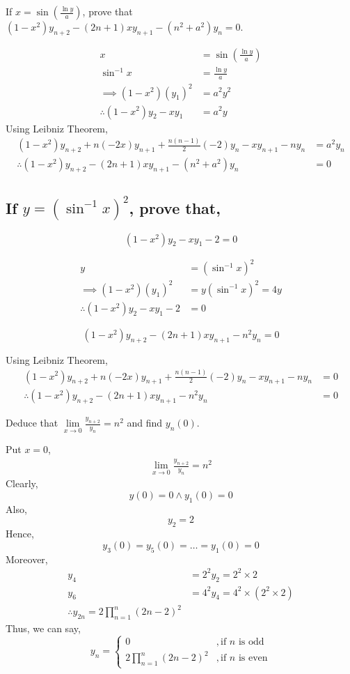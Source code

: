\begin{asign}
	If $x=\sin(\frac{\ln y}{a})$, prove that $(1-x^2)y_{n+2}-(2n+1)xy_{n+1}-(n^2+a^2)y_n=0$.
\end{asign}
\begin{anse}
	\[\begin{split}
		x&=\sin(\frac{\ln y}{a})\\
		\sin^{-1}x&=\frac{\ln y}{a}\\
		\implies (1-x^2)(y_1)^2&=a^2y^2\\
		\therefore (1-x^2)y_2-xy_1&=a^2y
	\end{split}\]
	Using Leibniz Theorem,
	\[\begin{split}
		(1-x^2)y_{n+2}+n(-2x)y_{n+1}+\frac{n(n-1)}{2}(-2)y_n-xy_{n+1}-ny_n&=a^2y_n\\
		\therefore (1-x^2)y_{n+2}-(2n+1)xy_{n+1}-(n^2+a^2)y_n&=0
	\end{split}\]
\end{anse}
\subsection{If $y=(\sin^{-1}x)^2$, prove that,}
\begin{asign}
	\[(1-x^2)y_2-xy_1-2=0\]
\end{asign}
\begin{anse}
	\[\begin{split}
		y&=(\sin^{-1}x)^2\\
		\implies (1-x^2)(y_1)^2&=y(\sin^{-1}x)^2=4y\\
		\therefore (1-x^2)y_2-xy_1-2&=0
	\end{split}\]
\end{anse}
\begin{asign}
	\[(1-x^2)y_{n+2}-(2n+1)xy_{n+1}-n^2y_n=0\]
\end{asign}
\begin{anse}
	Using Leibniz Theorem,
	\[\begin{split}
		(1-x^2)y_{n+2}+n(-2x)y_{n+1}+\frac{n(n-1)}{2}(-2)y_n-xy_{n+1}-ny_n&=0\\
		\therefore (1-x^2)y_{n+2}-(2n+1)xy_{n+1}-n^2y_n&=0
	\end{split}\]
\end{anse}
\begin{asign}
	Deduce that $\lim\limits_{x\to0}\frac{y_{n+2}}{y_n}=n^2$ and find $y_n(0)$.
\end{asign}
\begin{anse}
	Put $x=0$,
	\[\begin{split}
		\lim\limits_{x\to0}\frac{y_{n+2}}{y_n}=n^2
	\end{split}\]
	Clearly,
	\[y(0)=0\land y_1(0)=0\]
	Also,
	\[y_2=2\]
	Hence,
	\[y_3(0)=y_5(0)=\ldots=y_1(0)=0\]
	Moreover,
	\[\begin{split}
		y_4&=2^2y_2=2^2\times2\\
		y_6&=4^2y_4=4^2\times(2^2\times 2)\\
		\therefore y_{2n}=2\prod_{n=1}^{n}(2n-2)^2
	\end{split}\]
	Thus, we can say,
	\[y_n=\begin{cases}
		0 &, \text{if $n$ is odd}\\
		2\prod_{n=1}^{n}(2n-2)^2 &, \text{if $n$ is even}
	\end{cases}\]
\end{anse}
